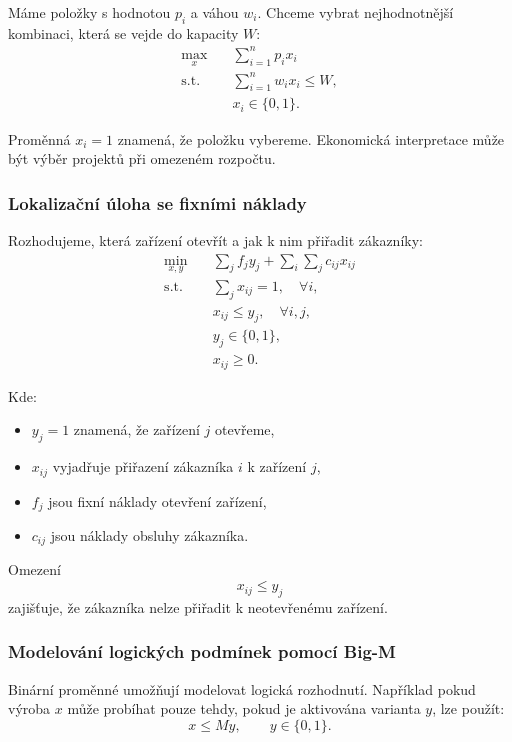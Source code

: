 Máme položky s hodnotou $p_i$ a váhou $w_i$. Chceme vybrat nejhodnotnější kombinaci, která se
vejde do kapacity $W$:
\[
\begin{aligned}
\max_x \quad & \sum_{i=1}^n p_ix_i\\
\text{s.t.}\quad & \sum_{i=1}^n w_ix_i\le W,\\
& x_i\in\{0,1\}.
\end{aligned}
\]

Proměnná $x_i=1$ znamená, že položku vybereme. Ekonomická interpretace může být výběr projektů
při omezeném rozpočtu.

\subsubsection{Lokalizační úloha se fixními náklady}

Rozhodujeme, která zařízení otevřít a jak k nim přiřadit zákazníky:
\[
\begin{aligned}
\min_{x,y}\quad
& \sum_j f_jy_j+\sum_i\sum_j c_{ij}x_{ij}\\
\text{s.t.}\quad
& \sum_j x_{ij}=1,\quad \forall i,\\
& x_{ij}\le y_j,\quad \forall i,j,\\
& y_j\in\{0,1\},\\
& x_{ij}\ge 0.
\end{aligned}
\]

Kde:
\begin{itemize}
    \item $y_j=1$ znamená, že zařízení $j$ otevřeme,
    \item $x_{ij}$ vyjadřuje přiřazení zákazníka $i$ k zařízení $j$,
    \item $f_j$ jsou fixní náklady otevření zařízení,
    \item $c_{ij}$ jsou náklady obsluhy zákazníka.
\end{itemize}

Omezení
\[
x_{ij}\le y_j
\]
zajišťuje, že zákazníka nelze přiřadit k neotevřenému zařízení.

\subsubsection{Modelování logických podmínek pomocí Big-M}

Binární proměnné umožňují modelovat logická rozhodnutí. Například pokud výroba $x$ může probíhat
pouze tehdy, pokud je aktivována varianta $y$, lze použít:
\[
x\le My,\qquad y\in\{0,1\}.
\]

